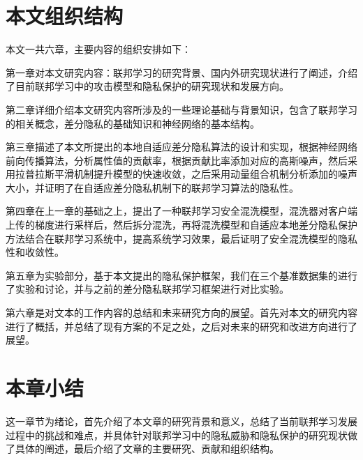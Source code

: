\section{本文组织结构}

本文一共六章，主要内容的组织安排如下：

第一章对本文研究内容：联邦学习的研究背景、国内外研究现状进行了阐述，介绍了目前联邦学习中的攻击模型和隐私保护的研究现状和发展方向。

第二章详细介绍本文研究内容所涉及的一些理论基础与背景知识，包含了联邦学习的相关概念，差分隐私的基础知识和神经网络的基本结构。

第三章描述了本文所提出的本地自适应差分隐私算法的设计和实现，根据神经网络前向传播算法，分析属性值的贡献率，根据贡献比率添加对应的高斯噪声，然后采用拉普拉斯平滑机制提升模型的快速收敛，之后采用动量组合机制分析添加的噪声大小，并证明了在自适应差分隐私机制下的联邦学习算法的隐私性。
  
第四章在上一章的基础之上，提出了一种联邦学习安全混洗模型，混洗器对客户端上传的梯度进行采样后，然后拆分混洗，再将混洗模型和自适应本地差分隐私保护方法结合在联邦学习系统中，提高系统学习效果，最后证明了安全混洗模型的隐私性和收敛性。
    
第五章为实验部分，基于本文提出的隐私保护框架，我们在三个基准数据集的进行了实验和讨论，并与之前的差分隐私联邦学习框架进行对比实验。

第六章是对文本的工作内容的总结和未来研究方向的展望。首先对本文的研究内容进行了概括，并总结了现有方案的不足之处，之后对未来的研究和改进方向进行了展望。

\section{本章小结}
这一章节为绪论，首先介绍了本文章的研究背景和意义，总结了当前联邦学习发展过程中的挑战和难点，并具体针对联邦学习中的隐私威胁和隐私保护的研究现状做了具体的阐述，最后介绍了文章的主要研究、贡献和组织结构。

